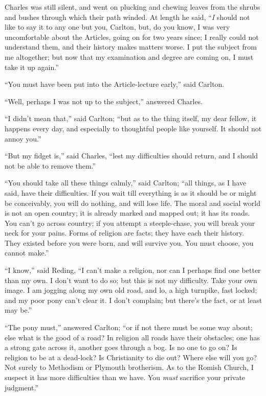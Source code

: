 Charles was still silent, and went on plucking and chewing leaves
from the shrubs and bushes through which their path winded. At length
he said, ``\emph{I} should not like to say it to any one but you,
Carlton, but, do you know, I was very uncomfortable about the
Articles, going on for two years since; I really could not understand
them, and their history makes matters worse. I put the subject from me
altogether; but now that my examination and degree are coming on, I
must take it up again.''

``You must have been put into the Article-lecture early,''
said Carlton.

``Well, perhaps I was not up to the subject,'' answered
Charles.

``I didn't mean that,'' said Carlton; ``but as to the
thing itself, my dear fellow, it happens every day, and especially to thoughtful people like yourself. It should not annoy
you.''

``But my fidget is,'' said Charles, ``lest my
difficulties should return, and I should not be able to remove
them.''

``You should take all these things calmly,'' said Carlton;
``all things, as I have said, have their difficulties. If you wait
till everything is as it should be or might be conceivably, you will
do nothing, and will lose life. The moral and social world is not an
open country; it is already marked and mapped out; it has its roads.
You can't go across country; if you attempt a steeple-chase, you will
break your neck for your pains. Forms of religion are facts; they have
each their history. They existed before you were born, and will
survive you. You must choose, you cannot make.''

``I know,'' said Reding, ``I can't make a religion, nor
can I perhaps find one better than my own. I don't want to do so; but
this is not my difficulty. Take your own image. I am jogging along my
own old road, and lo, a high turnpike, fast locked; and my poor pony
can't clear it. I don't complain; but there's the fact, or at least may
be.''

``The pony must,'' answered Carlton; ``or if not there
must be some way about; else what is the good of a road? In religion
all roads have their obstacles; one has a strong gate across it,
another goes through a bog. Is no one to go on? Is religion to be at a
dead-lock? Is Christianity to die out? Where else will you go? Not
surely to Methodism or Plymouth brotherism. As to the Romish
Church, I suspect it has more difficulties than we have. You \emph{must}
sacrifice your private judgment.''

